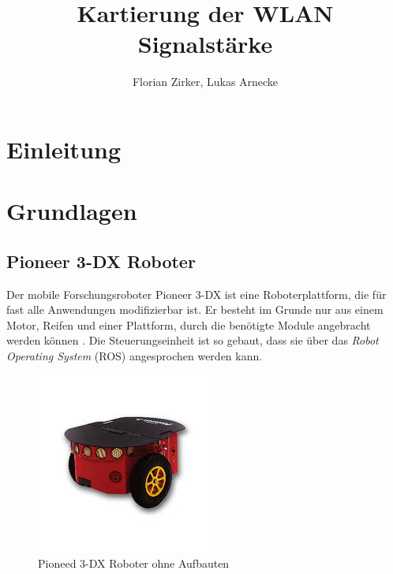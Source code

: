 \documentclass{scrartcl}%
\begin{document}
\titlehead{AMR}%
\subject{Projektbericht AMR}%
\title{Kartierung der WLAN Signalstärke}%
\author{Florian Zirker, Lukas Arnecke}%
\publishers{Prof. Dr. Thomas Ihme}%
\maketitle%
\tableofcontents

\section{Einleitung}

\section{Grundlagen}
\subsection{Pioneer 3-DX Roboter}
Der mobile Forschungsroboter Pioneer 3-DX ist eine Roboterplattform, die für fast alle Anwendungen modifizierbar ist. Er besteht im Grunde nur aus einem Motor, Reifen und einer Plattform, durch die benötigte Module angebracht werden können \cite{pioneer}. Die Steuerungseinheit ist so gebaut, dass sie über das \textit{Robot Operating System} (ROS) angesprochen werden kann.

\begin{figure}
	\centering
	\includegraphics{bilder/pioneerRoh.jpg}
	\caption{Pioneed 3-DX Roboter ohne Aufbauten}
	\label{pioneerRoh}
\end{figure}
\end{document}
